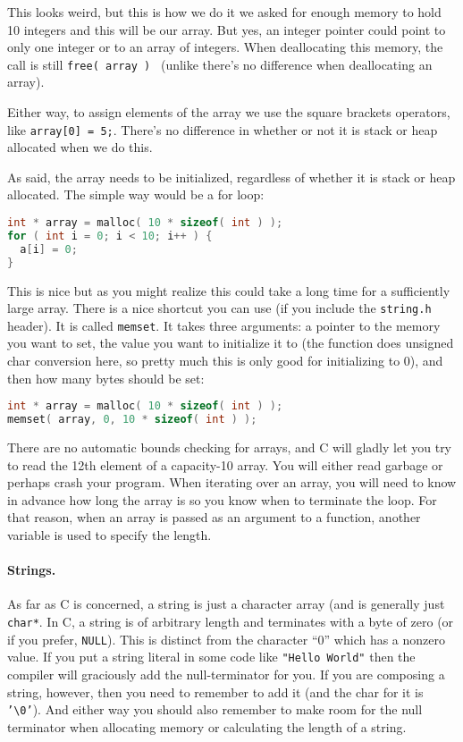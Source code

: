 This looks weird, but this is how we do it we asked for enough memory to hold 10 integers and this will be our array. But yes, an integer pointer could point to only one integer or to an array of integers. When deallocating this memory, the call is still \texttt{free( array ) } (unlike \Cpp there's no difference when deallocating an array).

Either way, to assign elements of the array we use the square brackets operators, like \texttt{array[0] = 5;}. There's no difference in whether or not it is stack or heap allocated when we do this. 

As said, the array needs to be initialized, regardless of whether it is stack or heap allocated. The simple way would be a for loop:

\begin{lstlisting}[language=C]
int * array = malloc( 10 * sizeof( int ) );
for ( int i = 0; i < 10; i++ ) {
  a[i] = 0;
}
\end{lstlisting}

This is nice but as you might realize this could take a long time for a sufficiently large array. There is a nice shortcut you can use (if you include the \texttt{string.h} header). It is called \texttt{memset}. It takes three arguments: a pointer to the memory you want to set, the value you want to initialize it to (the function does unsigned char conversion here, so pretty much this is only good for initializing to 0), and then how many bytes should be set:

\begin{lstlisting}[language=C]
int * array = malloc( 10 * sizeof( int ) );
memset( array, 0, 10 * sizeof( int ) );
\end{lstlisting}

There are no automatic bounds checking for arrays, and C will gladly let you try to read the 12th element of a capacity-10 array. You will either read garbage or perhaps crash your program. When iterating over an array, you will need to know in advance how long the array is so you know when to terminate the loop. For that reason, when an array is passed as an argument to a function, another variable is used to specify the length.

\paragraph{Strings.}

As far as C is concerned, a string is just a character array (and is generally just \texttt{char*}. In C, a string is of arbitrary length and terminates with a byte of zero (or if you prefer, \texttt{NULL}). This is distinct from the character ``0'' which has a nonzero value. If you put a string literal in some code like \texttt{"Hello World"} then the compiler will graciously add the null-terminator for you. If you are composing a string, however, then you need to remember to add it (and the char for it is \texttt{'\textbackslash0'}). And either way you should also remember to make room for the null terminator when allocating memory or calculating the length of a string.

